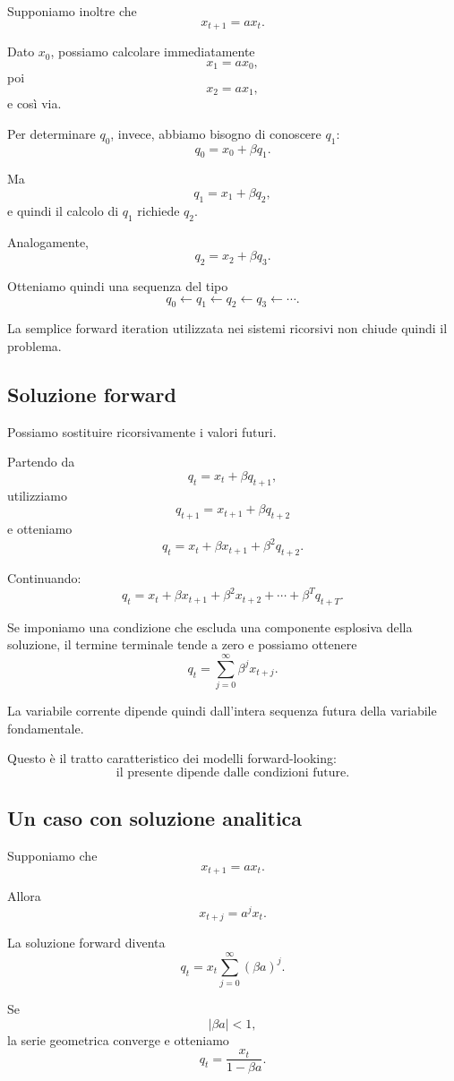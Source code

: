 \documentclass{book}
\begin{document}
Supponiamo inoltre che
\[
x_{t+1}=a x_t.
\]

Dato $x_0$, possiamo calcolare immediatamente
\[
x_1=ax_0,
\]
poi
\[
x_2=a x_1,
\]
e così via.

Per determinare $q_0$, invece, abbiamo bisogno di conoscere $q_1$:
\[
q_0=x_0+\beta q_1.
\]

Ma
\[
q_1=x_1+\beta q_2,
\]
e quindi il calcolo di $q_1$ richiede $q_2$.

Analogamente,
\[
q_2=x_2+\beta q_3.
\]

Otteniamo quindi una sequenza del tipo
\[
q_0
\longleftarrow
q_1
\longleftarrow
q_2
\longleftarrow
q_3
\longleftarrow
\cdots.
\]

La semplice forward iteration utilizzata nei sistemi ricorsivi non
chiude quindi il problema.


\subsection{Soluzione forward}

Possiamo sostituire ricorsivamente i valori futuri.

Partendo da
\[
q_t
=
x_t+\beta q_{t+1},
\]
utilizziamo
\[
q_{t+1}
=
x_{t+1}+\beta q_{t+2}
\]
e otteniamo
\[
q_t
=
x_t+\beta x_{t+1}
+\beta^2q_{t+2}.
\]

Continuando:
\[
q_t
=
x_t
+
\beta x_{t+1}
+
\beta^2x_{t+2}
+
\cdots
+
\beta^Tq_{t+T}.
\]

Se imponiamo una condizione che escluda una componente esplosiva della
soluzione, il termine terminale tende a zero e possiamo ottenere
\[
q_t
=
\sum_{j=0}^{\infty}
\beta^j x_{t+j}.
\]

La variabile corrente dipende quindi dall'intera sequenza futura della
variabile fondamentale.

Questo è il tratto caratteristico dei modelli forward-looking:
\[
\boxed{
\text{il presente dipende dalle condizioni future}
}.
\]


\subsection{Un caso con soluzione analitica}

Supponiamo che
\[
x_{t+1}=a x_t.
\]

Allora
\[
x_{t+j}=a^j x_t.
\]

La soluzione forward diventa
\[
q_t
=
x_t
\sum_{j=0}^{\infty}
(\beta a)^j.
\]

Se
\[
|\beta a|<1,
\]
la serie geometrica converge e otteniamo
\[
q_t
=
\frac{x_t}{1-\beta a}.
\]
\end{document}
